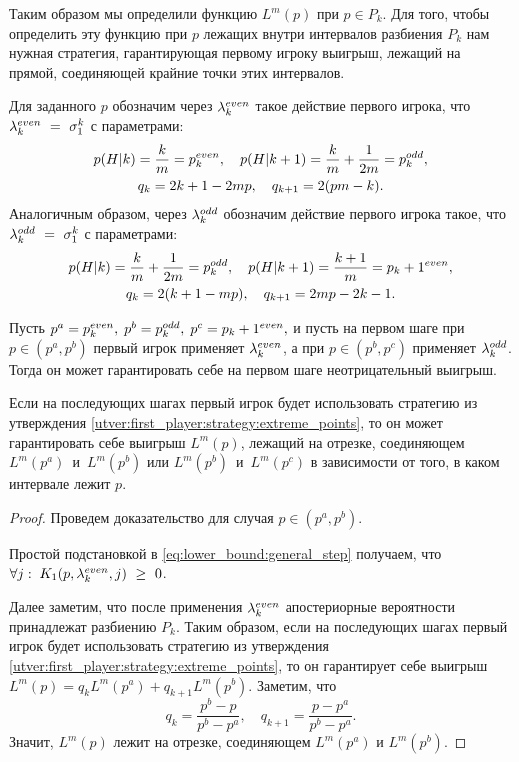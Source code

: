 Таким образом мы определили функцию $ L^m(p) $ при $ p \in P_k $.
Для того, чтобы определить эту функцию при $ p $ лежащих внутри интервалов разбиения $ P_k $ нам нужная стратегия, гарантирующая первому игроку выигрыш, лежащий на прямой, соединяющей крайние точки этих интервалов.

Для заданного $ p $ обозначим через $ \lambda_{k}^{even} $ такое действие первого игрока, что $ \lambda_{k}^{even}~=~\sigma^k_1 $ с параметрами:
\begin{gather*}
  p(H|k) = \frac{k}{m} = p_k^{even}, \quad
  p(H|k+1) = \frac{k}{m} + \frac{1}{2m} = p_k^{odd}, \\
  q_k = 2k + 1 - 2mp, \quad
  q_{k+1} = 2(pm - k).
\end{gather*}
Аналогичным образом, через $ \lambda_{k}^{odd} $ обозначим действие первого игрока такое, что $ \lambda_{k}^{odd}~=~\sigma^k_1 $ с параметрами:
\begin{gather*}
  p(H|k) = \frac{k}{m} + \frac{1}{2m} = p_k^{odd}, \quad
  p(H|k+1) = \frac{k + 1}{m} = p_k+1^{even}, \\
  q_k = 2(k + 1 - mp), \quad
  q_{k+1} = 2mp -2k - 1.
\end{gather*}

\begin{utver}
\label{utver:lower_bound:lottery}
  Пусть 
  $
    p^a = p_k^{even}, \;
    p^b = p_k^{odd}, \;
    p^c = p_k+1^{even},
  $
  и пусть на первом шаге при $ p \in (p^a, p^b) $ первый игрок применяет $ \lambda_{k}^{even} $, а при $ p \in (p^b, p^c) $ применяет $ \lambda_{k}^{odd} $. Тогда он может гарантировать себе на первом шаге неотрицательный выигрыш.
  
  Если на последующих шагах первый игрок будет использовать стратегию из утверждения \ref{utver:first_player:strategy:extreme_points}, то он может гарантировать себе выигрыш $ L^m(p) $, лежащий на отрезке, соединяющем $ L^m(p^a) $~и~$ L^m(p^b) $ или $ L^m(p^b) $~и~$ L^m(p^c) $ в зависимости от того, в каком интервале лежит $ p $.
\end{utver}
\begin{proof}
Проведем доказательство для случая $ p \in (p^a, p^b) $. 

Простой подстановкой в \eqref{eq:lower_bound:general_step} получаем, что 
$ \forall j: \; K_1(p, \lambda_{k}^{even}, j)~\geq~0 $. 

Далее заметим, что после применения $ \lambda_{k}^{even} $ апостериорные вероятности принадлежат разбиению $ P_k $.
Таким образом, если на последующих шагах первый игрок будет использовать стратегию из утверждения \ref{utver:first_player:strategy:extreme_points}, то он гарантирует себе выигрыш
$ L^m(p) = q_k L^m(p^a) + q_{k+1} L^m(p^b) $. 
Заметим, что 
\[
    q_k = \frac{p^b - p}{p^b - p^a}, \quad q_{k+1} = \frac{p - p^a}{p^b - p^a}.
\]
Значит, $ L^m(p) $ лежит на отрезке, соединяющем $ L^m(p^a) $ и $ L^m(p^b) $.
\end{proof}

